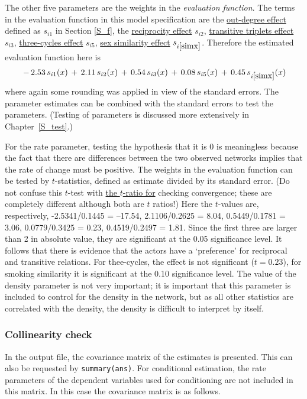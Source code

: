 \documentclass[a4paper,fleqn,11pt]{article}
\newcommand{\+}{\, + \,}
\renewcommand{\min}{\, - \,}
\begin{document}
The other five parameters are the weights in the \emph{evaluation function}.
The terms in the evaluation function in this model specification are
the \hyperlink{T_density}{out-degree effect} defined as $s_{i1}$ in
Section \ref{S_f}, the
\hyperlink{T_reci}{reciprocity effect} $s_{i2}$,
\hyperlink{T_transtrip}{transitive triplets effect} $s_{i3}$,
\hyperlink{T_cycle3}{three-cycles effect} $s_{i5}$,
\hyperlink{T_simx}{sex similarity effect} $s_{i\ref{simx}}$.
Therefore the
estimated evaluation function here is
\[
\min 2.53 \, s_{i1}(x) \+ 2.11\, s_{i2}(x) \+ 0.54 \, s_{i3}(x)\+ 0.08 \, s_{i5}(x)\+ 0.45 \, s_{i\ref{simx}}(x)
\]
where again some rounding was applied in view of the standard errors.
The parameter estimates can be combined with
the standard errors to test the parameters.
(Testing of parameters is discussed more extensively
in Chapter~\ref{S_test}.)

 For the rate
parameter, testing the hypothesis that it is 0 is meaningless
because the fact that there are differences between the two observed
networks implies that the rate of change must be positive. The
weights in the evaluation function can be tested by $t$-statistics,
defined as estimate divided by its standard error. (Do not confuse
this $t$-test with \hyperlink{T_convergence}{the $t$-ratio for}
checking convergence; these are completely different although both
are $t$ ratios!) Here the $t$-values are, respectively,
 -2.5341/0.1445 = --17.54,
  2.1106/0.2625 = 8.04,
  0.5449/0.1781 = 3.06,
  0.0779/0.3425 = 0.23,
  0.4519/0.2497 = 1.81.
 Since the first three are larger than 2 in absolute value, they are
significant at the 0.05 significance level. It follows that there is
evidence that the actors have a `preference' for reciprocal
and transitive relations.
For thee-cycles, the effect is not significant ($t = 0.23$),
for smoking similarity it is significant at the 0.10 significance level.
The value of the density parameter is not very important; it is
important that this parameter is included to control for the density
in the network, but as all other statistics are correlated with the
density, the density is difficult to interpret by itself.

\subsubsection{Collinearity check}
\label{S_collinear}

In the output file, the covariance matrix
of the estimates is presented.
This can also be requested by \texttt{summary(ans)}.
For conditional estimation, the rate parameters of the dependent variables
used for conditioning are not included in this matrix.
In this case the covariance matrix is as follows.
\end{document}
